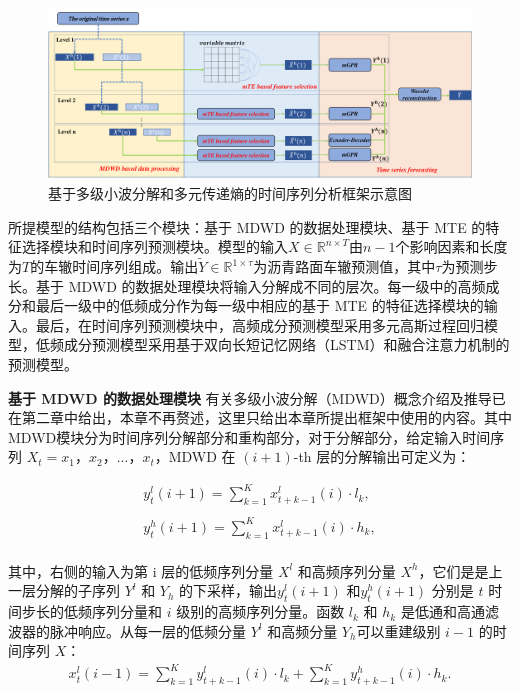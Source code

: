 \begin{figure}[ht]
\begin{center}
\includegraphics[scale=0.4]{./ch4/fig4_1.pdf}
\caption{基于多级小波分解和多元传递熵的时间序列分析框架示意图} \label{fig4_1}
\end{center}
\end{figure}
所提模型的结构包括三个模块：基于 MDWD 的数据处理模块、基于 MTE 的特征选择模块和时间序列预测模块。模型的输入$X \in \mathbb{R}^{n\times T}$由$n-1$个影响因素和长度为$T$的车辙时间序列组成。输出$\tilde{Y}\in\mathbb{R}^{1\times \tau}$为沥青路面车辙预测值，其中$\tau$为预测步长。基于 MDWD 的数据处理模块将输入分解成不同的层次。每一级中的高频成分和最后一级中的低频成分作为每一级中相应的基于 MTE 的特征选择模块的输入。最后，在时间序列预测模块中，高频成分预测模型采用多元高斯过程回归模型，低频成分预测模型采用基于双向长短记忆网络（LSTM）和融合注意力机制的预测模型。

\textbf{基于 MDWD 的数据处理模块} 有关多级小波分解（MDWD）概念介绍及推导已在第二章中给出，本章不再赘述，这里只给出本章所提出框架中使用的内容。其中MDWD模块分为时间序列分解部分和重构部分，对于分解部分，给定输入时间序列 $X_{t}=x_{1}，x_{2}，...，x_{t}$，MDWD 在 $(i+1)$-th 层的分解输出可定义为：

\begin{equation}\label{npl1}
\begin{array}{ll}
y^{l}_{t}(i+1) = \sum_{k=1}^{K}x^{l}_{t+k-1}(i)\cdot l_{k},\\
\\
y^{h}_{t}(i+1) = \sum_{k=1}^{K}x^{l}_{t+k-1}(i)\cdot h_{k},\\
\end{array}
\end{equation}

其中，右侧的输入为第 i 层的低频序列分量 $X^{l}$ 和高频序列分量 $X^{h}$，它们是是上一层分解的子序列 $Y^{l}$ 和 $Y_{h}$ 的下采样，输出$y^{l}_{t}(i+1)$ 和$y^{h}_{t}(i+1)$ 分别是 $t$ 时间步长的低频序列分量和 $i$ 级别的高频序列分量。函数 $l_{k}$ 和 $h_{k}$ 是低通和高通滤波器的脉冲响应。从每一层的低频分量 $Y^{l}$ 和高频分量 $Y_{h}$可以重建级别 $i-1$ 的时间序列 $X$：	
\begin{equation}\label{npl1}
\begin{array}{ll}
x^{l}_{t}(i-1) = \sum_{k=1}^{K}y^{l}_{t+k-1}(i)\cdot l_{k}+\sum_{k=1}^{K}y^{h}_{t+k-1}(i)\cdot h_{k}.\\
\\
\end{array}
\end{equation}

